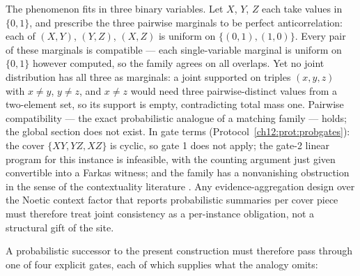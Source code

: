 \begin{example}
\label{ch12:ex:marginal}
The phenomenon fits in three binary variables. Let $X$, $Y$, $Z$ each
take values in $\{0, 1\}$, and prescribe the three pairwise marginals to
be perfect anticorrelation: each of $(X, Y)$, $(Y, Z)$, $(X, Z)$ is
uniform on $\{(0,1), (1,0)\}$. Every pair of these marginals is
compatible --- each single-variable marginal is uniform on $\{0,1\}$
however computed, so the family agrees on all overlaps. Yet no joint
distribution has all three as marginals: a joint supported on triples
$(x, y, z)$ with $x \neq y$, $y \neq z$, and $x \neq z$ would need three
pairwise-distinct values from a two-element set, so its support is
empty, contradicting total mass one. Pairwise compatibility --- the
exact probabilistic analogue of a matching family --- holds; the global
section does not exist. In gate terms
(Protocol~\ref{ch12:prot:probgates}): the cover
$\{XY, YZ, XZ\}$ is cyclic, so gate 1 does not apply; the gate-2 linear
program for this instance is infeasible, with the counting argument
just given convertible into a Farkas witness; and the family has a
nonvanishing obstruction in the sense of the contextuality literature
\cite{abramskycohomology,abramskyparadox}. Any evidence-aggregation design over the
Noetic context factor that reports probabilistic summaries per cover
piece must therefore treat joint consistency as a per-instance
obligation, not a structural gift of the site.
\end{example}

A probabilistic successor to the present construction must therefore pass
through one of four explicit gates, each of which supplies what the analogy
omits:

